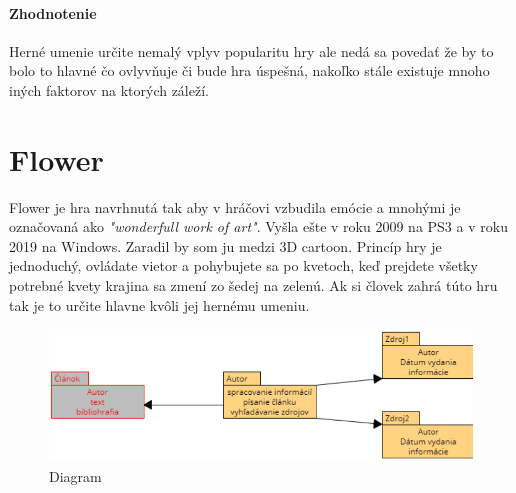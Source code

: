 \documentclass[10pt,twoside,slovak,a4paper]{article}
\begin{document}
\paragraph{Zhodnotenie}
Herné umenie určite nemalý vplyv popularitu hry ale nedá sa povedať že by to bolo to hlavné čo ovlyvňuje či bude hra úspešná, nakoľko stále existuje mnoho iných faktorov na ktorých záleží. 

\section{Flower}
\cite{8944678}
Flower je hra  navrhnutá tak aby v hráčovi vzbudila emócie a mnohými je označovaná ako \emph{"wonderfull work of art"}. Vyšla ešte v roku 2009 na PS3 a v roku 2019 na Windows. Zaradil by som ju medzi 3D cartoon. Princíp hry je jednoduchý, ovládate vietor a pohybujete sa po kvetoch, keď prejdete všetky potrebné kvety krajina sa zmení zo šedej na zelenú. Ak si človek zahrá túto hru tak je to určite hlavne kvôli jej hernému umeniu.






















\begin{figure}[!ht]
\begin{center}
\includegraphics[width=12cm]{diagram novy.png}
\caption{Diagram}
\end{center}
\end{figure}
\end{document}
